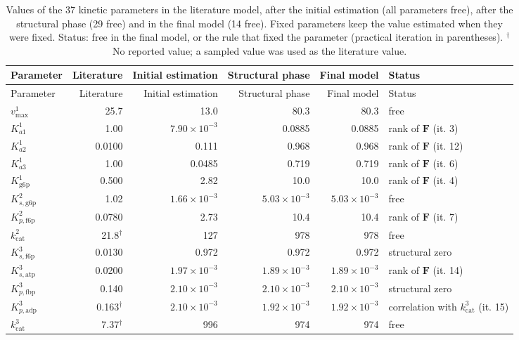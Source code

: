 \begin{longtable}{lrrrrl}
\caption{Values of the 37 kinetic parameters in the literature model, after the initial estimation (all parameters free), after the structural phase (29 free) and in the final model (14 free). Fixed parameters keep the value estimated when they were fixed. Status: free in the final model, or the rule that fixed the parameter (practical iteration in parentheses). $^\dagger$No reported value; a sampled value was used as the literature value.}
\label{tab:param_evolution}\\
\toprule
Parameter & Literature & Initial estimation & Structural phase & Final model & Status \\
\midrule
\endfirsthead
\toprule
Parameter & Literature & Initial estimation & Structural phase & Final model & Status \\
\midrule
\endhead
\bottomrule
\endlastfoot
$v_{\max}^{1}$ & 25.7 & 13.0 & 80.3 & 80.3 & free \\
$K_{a1}^{1}$ & 1.00 & $7.90 \times 10^{-3}$ & 0.0885 & 0.0885 & rank of $\mathbf{F}$ (it. 3) \\
$K_{a2}^{1}$ & 0.0100 & 0.111 & 0.968 & 0.968 & rank of $\mathbf{F}$ (it. 12) \\
$K_{a3}^{1}$ & 1.00 & 0.0485 & 0.719 & 0.719 & rank of $\mathbf{F}$ (it. 6) \\
$K_{\mathrm{g6p}}^{1}$ & 0.500 & 2.82 & 10.0 & 10.0 & rank of $\mathbf{F}$ (it. 4) \\
$K_{s,\mathrm{g6p}}^{2}$ & 1.02 & $1.66 \times 10^{-3}$ & $5.03 \times 10^{-3}$ & $5.03 \times 10^{-3}$ & free \\
$K_{p,\mathrm{f6p}}^{2}$ & 0.0780 & 2.73 & 10.4 & 10.4 & rank of $\mathbf{F}$ (it. 7) \\
$k_{\mathrm{cat}}^{2}$ & 21.8$^\dagger$ & 127 & 978 & 978 & free \\
$K_{s,\mathrm{f6p}}^{3}$ & 0.0130 & 0.972 & 0.972 & 0.972 & structural zero \\
$K_{s,\mathrm{atp}}^{3}$ & 0.0200 & $1.97 \times 10^{-3}$ & $1.89 \times 10^{-3}$ & $1.89 \times 10^{-3}$ & rank of $\mathbf{F}$ (it. 14) \\
$K_{p,\mathrm{fbp}}^{3}$ & 0.140 & $2.10 \times 10^{-3}$ & $2.10 \times 10^{-3}$ & $2.10 \times 10^{-3}$ & structural zero \\
$K_{p,\mathrm{adp}}^{3}$ & 0.163$^\dagger$ & $2.10 \times 10^{-3}$ & $1.92 \times 10^{-3}$ & $1.92 \times 10^{-3}$ & correlation with $k_{\mathrm{cat}}^{3}$ (it. 15) \\
$k_{\mathrm{cat}}^{3}$ & 7.37$^\dagger$ & 996 & 974 & 974 & free \\

\end{longtable}
